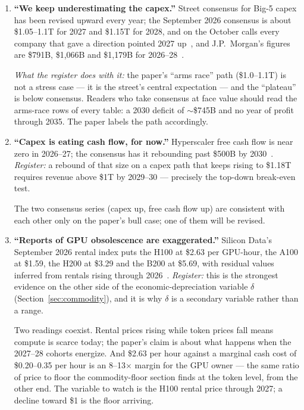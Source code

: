 \documentclass[11pt,letterpaper]{article}
\begin{document}
\begin{enumerate}
\item \textbf{``We keep underestimating the capex.''} Street consensus for Big-5 capex has been revised upward every year; the September 2026 consensus is about \$1.05--1.1T for 2027 and \$1.15T for 2028, and on the October calls every company that gave a direction pointed 2027 up~\cite{ref:gs_capex_bbg}, and J.P.~Morgan's figures are \$791B, \$1,066B and \$1,179B for 2026--28~\cite{ref:a16z_som,ref:jpmam_gtm}.

\emph{What the register does with it:} the paper's ``arms race'' path (\$1.0--1.1T) is not a stress case --- it is the street's central expectation --- and the ``plateau'' is below consensus. Readers who take consensus at face value should read the arms-race rows of every table: a 2030 deficit of $\sim$\$745B and no year of profit through 2035. The paper labels the path accordingly.

\item \textbf{``Capex is eating cash flow, for now.''} Hyperscaler free cash flow is near zero in 2026--27; the consensus has it rebounding past \$500B by 2030~\cite{ref:a16z_som,ref:jpmam_gtm}. \emph{Register:} a rebound of that size on a capex path that keeps rising to \$1.18T requires revenue above \$1T by 2029--30 --- precisely the top-down break-even test.

The two consensus series (capex up, free cash flow up) are consistent with each other only on the paper's bull case; one of them will be revised.

\item \textbf{``Reports of GPU obsolescence are exaggerated.''} Silicon Data's September 2026 rental index puts the H100 at \$2.63 per GPU-hour, the A100 at \$1.59, the H200 at \$3.29 and the B200 at \$5.69, with residual values inferred from rentals rising through 2026~\cite{ref:a16z_som,ref:silicon_data}. \emph{Register:} this is the strongest evidence on the other side of the economic-depreciation variable $\delta$ (Section~\ref{sec:commodity}), and it is why $\delta$ is a secondary variable rather than a range.

Two readings coexist. Rental prices rising while token prices fall means compute is scarce today; the paper's claim is about what happens when the 2027--28 cohorts energize. And \$2.63 per hour against a marginal cash cost of \$0.20--0.35 per hour is an 8--13$\times$ margin for the GPU owner --- the same ratio of price to floor the commodity-floor section finds at the token level, from the other end. The variable to watch is the H100 rental price through 2027; a decline toward \$1 is the floor arriving.


\end{enumerate}
\end{document}
